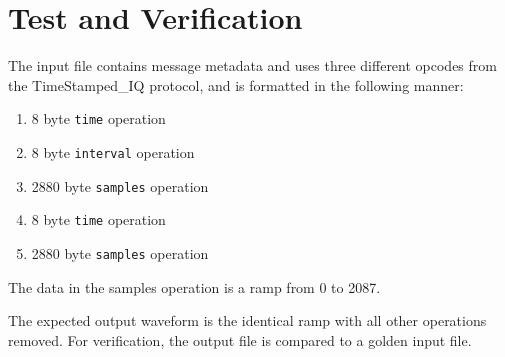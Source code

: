\section*{Test and Verification}
\begin{flushleft}
	The input file contains message metadata and uses three different opcodes from the TimeStamped\_IQ protocol, and is formatted in the following manner:
	\begin{enumerate}
	\item 8 byte \texttt{time} operation
	\item 8 byte \texttt{interval} operation
	\item 2880 byte \texttt{samples} operation
	\item 8 byte \texttt{time} operation
	\item 2880 byte \texttt{samples} operation
	\end{enumerate}
	The data in the samples operation is a ramp from 0 to 2087.\par\medskip
	The expected output waveform is the identical ramp with all other operations removed. For verification, the output file is compared to a golden input file.
\end{flushleft}

